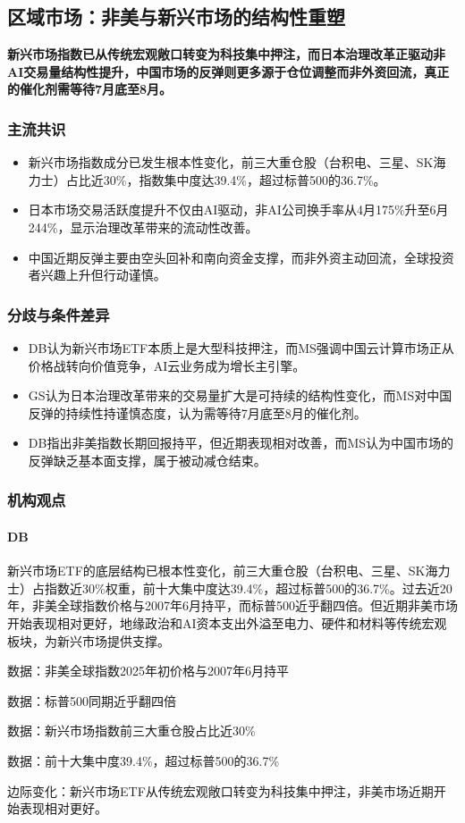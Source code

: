 \documentclass[11pt]{ctexart}
\begin{document}
\subsection{区域市场：非美与新兴市场的结构性重塑}
\textbf{新兴市场指数已从传统宏观敞口转变为科技集中押注，而日本治理改革正驱动非AI交易量结构性提升，中国市场的反弹则更多源于仓位调整而非外资回流，真正的催化剂需等待7月底至8月。}
\subsubsection*{主流共识}
\begin{itemize}
  \item 新兴市场指数成分已发生根本性变化，前三大重仓股（台积电、三星、SK海力士）占比近30\%，指数集中度达39.4\%，超过标普500的36.7\%。
  \item 日本市场交易活跃度提升不仅由AI驱动，非AI公司换手率从4月175\%升至6月244\%，显示治理改革带来的流动性改善。
  \item 中国近期反弹主要由空头回补和南向资金支撑，而非外资主动回流，全球投资者兴趣上升但行动谨慎。
\end{itemize}
\subsubsection*{分歧与条件差异}
\begin{itemize}
  \item DB认为新兴市场ETF本质上是大型科技押注，而MS强调中国云计算市场正从价格战转向价值竞争，AI云业务成为增长主引擎。
  \item GS认为日本治理改革带来的交易量扩大是可持续的结构性变化，而MS对中国反弹的持续性持谨慎态度，认为需等待7月底至8月的催化剂。
  \item DB指出非美指数长期回报持平，但近期表现相对改善，而MS认为中国市场的反弹缺乏基本面支撑，属于被动减仓结束。
\end{itemize}
\subsubsection*{机构观点}
\paragraph{DB} 新兴市场ETF的底层结构已根本性变化，前三大重仓股（台积电、三星、SK海力士）占指数近30\%权重，前十大集中度达39.4\%，超过标普500的36.7\%。过去近20年，非美全球指数价格与2007年6月持平，而标普500近乎翻四倍。但近期非美市场开始表现相对更好，地缘政治和AI资本支出外溢至电力、硬件和材料等传统宏观板块，为新兴市场提供支撑。
{\small\color{refgray}数据：非美全球指数2025年初价格与2007年6月持平\par}
{\small\color{refgray}数据：标普500同期近乎翻四倍\par}
{\small\color{refgray}数据：新兴市场指数前三大重仓股占比近30\%\par}
{\small\color{refgray}数据：前十大集中度39.4\%，超过标普500的36.7\%\par}
{\small\color{refgray}边际变化：新兴市场ETF从传统宏观敞口转变为科技集中押注，非美市场近期开始表现相对更好。\par}
\end{document}
